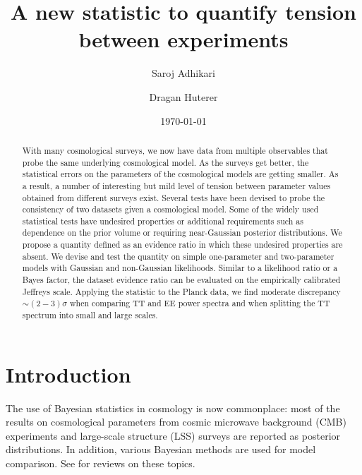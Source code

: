 \documentclass[amsmath, prd, reprint, aps]{revtex4-1}
\newcommand{\saroj}[1]{\textcolor{blue}{(Saroj: #1)}}
\begin{document}
    \title{A new statistic to quantify tension between experiments} %
    \author{Saroj Adhikari} 
    \author{Dragan Huterer} 
    \date{\today}
    
    \begin{abstract}
        With many cosmological surveys, we now have data from multiple observables that probe the same underlying cosmological model. As the surveys get better, the statistical errors on the parameters of the cosmological models are getting smaller. As a result, a number of interesting but mild level of tension between parameter values obtained from different surveys exist. Several tests have been devised to probe the {consistency} of two datasets given a cosmological model. Some of the widely used statistical tests have undesired properties or additional requirements such as dependence on the prior volume or requiring near-Gaussian posterior distributions. We propose a quantity defined as an evidence ratio in which these undesired properties are absent. We devise and test the quantity on simple one-parameter and two-parameter models with Gaussian and non-Gaussian likelihoods. Similar to a likelihood ratio or a Bayes factor, the dataset evidence ratio can be evaluated on the empirically calibrated Jeffreys scale. Applying the statistic to the Planck data, we find moderate discrepancy $\sim (2-3)\sigma$ when comparing TT and EE power spectra and when splitting the TT spectrum into small and large scales.
    \end{abstract}
    
    \maketitle
\section{Introduction}
The use of Bayesian statistics in cosmology is now commonplace: most of the results on cosmological parameters from cosmic microwave background (CMB) experiments \cite{Ade:2015xua} and large-scale structure (LSS) surveys \cite{Abbott:2017wau} are reported as posterior distributions. In addition, various Bayesian methods are used for model comparison. See \cite{Trotta:2008qt} for reviews on these topics.
\end{document}
